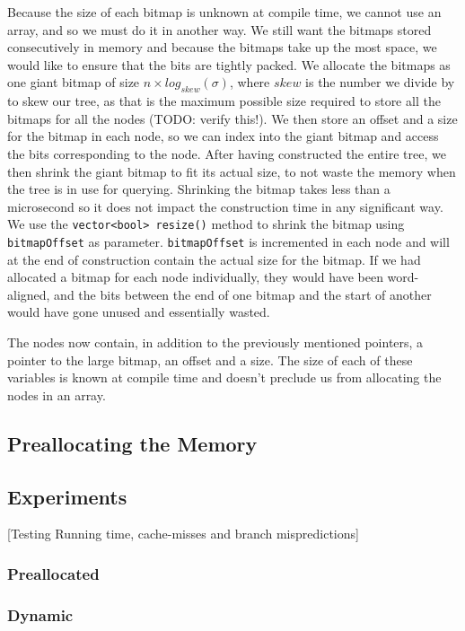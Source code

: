 Because the size of each bitmap is unknown at compile time, we cannot use an array, and so we must do it in another way. We still want the bitmaps stored consecutively in memory and because the bitmaps take up the most space, we would like to ensure that the bits are tightly packed.
We allocate the bitmaps as one giant bitmap of size $n \times log_{skew}(\sigma)$, where $skew$ is the number we divide by to skew our tree, as that is the maximum possible size required to store all the bitmaps for all the nodes (TODO: verify this!). We then store an offset and a size for the bitmap in each node, so we can index into the giant bitmap and access the bits corresponding to the node.
After having constructed the entire tree, we then shrink the giant bitmap to fit its actual size, to not waste the memory when the tree is in use for querying. 
Shrinking the bitmap takes less than a microsecond so it does not impact the construction time in any significant way. We use the \texttt{vector<bool> resize()} method to shrink the bitmap using \texttt{bitmapOffset} as parameter. 
\texttt{bitmapOffset} is incremented in each node and will at the end of construction contain the actual size for the bitmap.
If we had allocated a bitmap for each node individually, they would have been word-aligned, and the bits between the end of one bitmap and the start of another would have gone unused and essentially wasted.

The nodes now contain, in addition to the previously mentioned pointers, a pointer to the large bitmap, an offset and a size.
The size of each of these variables is known at compile time and doesn't preclude us from allocating the nodes in an array.

\subsection{Preallocating the Memory}

\subsection{Experiments}
[Testing Running time, cache-misses and branch mispredictions]
\subsubsection{Preallocated}

\subsubsection{Dynamic}




